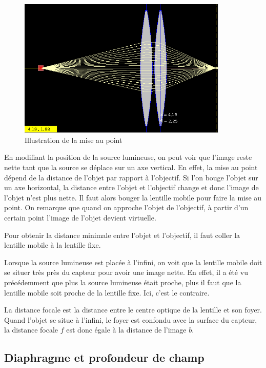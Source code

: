 \begin{figure}[H]
      \center
      \includegraphics[width=10cm]{ressources/tp1/mise_au_point1.png}
      \caption{Illustration de la mise au point}
\end{figure}

En modifiant la position de la source lumineuse, on peut voir que l'image reste nette tant que la source 
se déplace sur un axe vertical. En effet, la mise au point dépend de la distance de l'objet par rapport à 
l'objectif. Si l'on bouge l'objet sur un axe horizontal, la distance entre l'objet et l'objectif change 
et donc l'image de l'objet n'est plus nette. Il faut alors bouger la lentille mobile pour faire la mise au point. 
On remarque que quand on approche l'objet de l'objectif, à partir d'un certain point l'image de l'objet 
devient virtuelle.\newline

Pour obtenir la distance minimale entre l'objet et l'objectif, il faut coller la lentille mobile à la lentille 
fixe.\newline

Lorsque la source lumineuse est placée à l'infini, on voit que la lentille mobile doit se situer très près du capteur
pour avoir une image nette. En effet, il a été vu précédemment que plus la source lumineuse était proche, plus 
il faut que la lentille mobile soit proche de la lentille fixe. Ici, c'est le contraire.\newline

La distance focale est la distance entre le centre optique de la lentille et son foyer. Quand l'objet se situe à l'infini, 
le foyer est confondu avec la surface du capteur, la distance focale $f$ est donc égale à la distance de 
l'image $b$.\newline


\subsection{Diaphragme et profondeur de champ}

